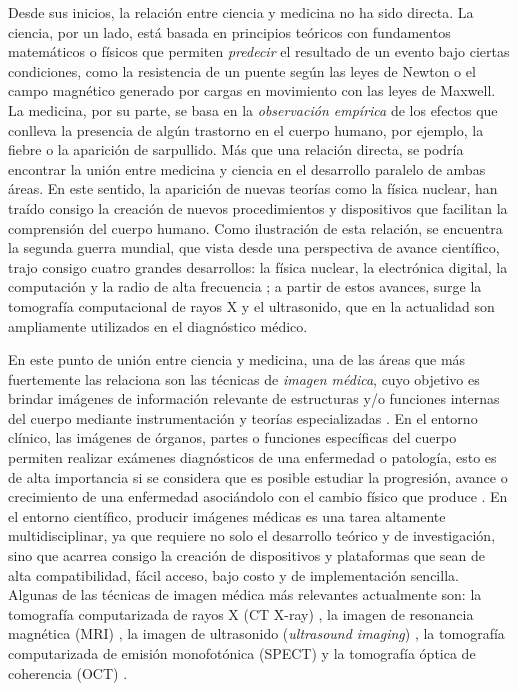 Desde sus inicios, la relación entre ciencia y medicina no ha sido directa. La ciencia, por un lado, está basada en principios teóricos con fundamentos matemáticos o físicos que permiten \emph{predecir} el resultado de un evento bajo ciertas condiciones, como la resistencia de un puente según las leyes de Newton o el campo magnético generado por cargas en movimiento con las leyes de Maxwell. La medicina, por su parte, se basa en la \emph{observación empírica} de los efectos que conlleva la presencia de algún trastorno en el cuerpo humano, por ejemplo, la fiebre o la aparición de sarpullido. Más que una relación directa, se podría encontrar la unión entre medicina y ciencia en el desarrollo paralelo de ambas áreas. En este sentido, la aparición de nuevas teorías como la física nuclear, han traído consigo la creación de nuevos procedimientos y dispositivos que facilitan la comprensión del cuerpo humano. Como ilustración de esta relación, se encuentra la segunda guerra mundial, que vista desde una perspectiva de avance científico, trajo consigo cuatro grandes desarrollos: la física nuclear, la electrónica digital, la computación y la radio de alta frecuencia \cite{Dhawan2008}; a partir de estos avances, surge la tomografía computacional de rayos X y el ultrasonido, que en la actualidad son ampliamente utilizados en el diagnóstico médico.

En este punto de unión entre ciencia y medicina, una de las áreas que más fuertemente las relaciona son las técnicas de \emph{imagen médica}, cuyo objetivo es brindar imágenes de información relevante de estructuras y/o funciones internas del cuerpo mediante instrumentación y teorías especializadas \cite{Guy2005}. En el entorno clínico, las imágenes de órganos, partes o funciones específicas del cuerpo permiten realizar exámenes diagnósticos de una enfermedad o patología, esto es de alta importancia si se considera que es posible estudiar la progresión, avance o crecimiento de una enfermedad asociándolo con el cambio físico que produce \cite{Beutel2009}. En el entorno científico, producir imágenes médicas es una tarea altamente multidisciplinar, ya que requiere no solo el desarrollo teórico y de investigación, sino que acarrea consigo la creación de dispositivos y plataformas que sean de alta compatibilidad, fácil acceso, bajo costo y de implementación sencilla. Algunas de las técnicas de imagen médica más relevantes actualmente son: la tomografía computarizada de rayos X (CT X-ray) \cite{Cierniak2011}, la imagen de resonancia magnética (MRI) \cite{Haacke1999}, la imagen de ultrasonido (\textit{ultrasound imaging}) \cite{Szabo}, la tomografía computarizada de emisión monofotónica (SPECT) \cite{Sharp2005} y la tomografía óptica de coherencia (OCT) \cite{Drexler2015}.

